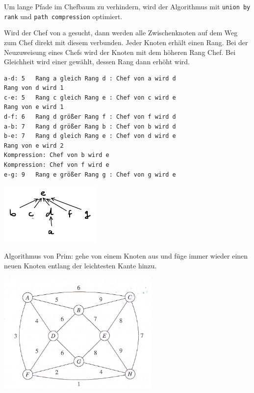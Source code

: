 \begin{frame}[fragile]
Um lange Pfade im Chefbaum zu verhindern, wird der Algorithmus mit \texttt{union by rank} und \texttt{path compression} optimiert.

 Wird der Chef von a gesucht,  dann werden alle Zwischenknoten auf dem Weg zum Chef direkt mit
diesem verbunden. Jeder Knoten erhält einen Rang. Bei der Neuzuweisung eines
Chefs wird der Knoten mit dem höheren Rang Chef. Bei Gleichheit wird einer gewählt, dessen Rang
dann erhöht wird.

\end{frame}
\begin{frame}[fragile]
\begin{lstlisting}[basicstyle=\scriptsize]
a-d: 5   Rang a gleich Rang d : Chef von a wird d
Rang von d wird 1
c-e: 5   Rang c gleich Rang e : Chef von c wird e
Rang von e wird 1
d-f: 6   Rang d größer Rang f : Chef von f wird d
a-b: 7   Rang d größer Rang b : Chef von b wird d
b-e: 7   Rang d gleich Rang e : Chef von d wird e
Rang von e wird 2
Kompression: Chef von b wird e
Kompression: Chef von f wird e
e-g: 9   Rang e größer Rang g : Chef von g wird e
\end{lstlisting}

\includegraphics[width=5cm]{kruskal_03_opt_chefbaum.png}
\end{frame}
\begin{frame}[fragile]
Algorithmus von Prim: gehe von einem Knoten aus und füge immer wieder einen neuen Knoten entlang der leichtesten Kante hinzu.

\includegraphics[width=8cm]{b7.png}

\end{frame}
 